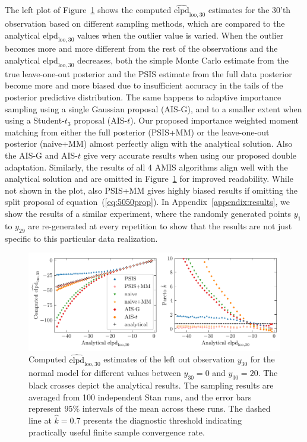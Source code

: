 \documentclass[12pt]{article}
\begin{document}
The left plot of Figure~\ref{fig:toynormal} shows the computed $\widehat{\text{elpd}}_{\text{loo},30}$ estimates
for the $30$'th observation based on different sampling methods, which are
compared to the analytical $\text{elpd}_{\text{loo},30}$ values when the outlier
value is varied.
When the outlier becomes more and more different from the rest of the observations and
the analytical $\text{elpd}_{\text{loo},30}$ decreases, both
the simple Monte Carlo estimate from the true leave-one-out
posterior and the PSIS estimate from the full data posterior
become more and more biased
due to insufficient accuracy in the tails of the posterior predictive distribution.
The same happens to adaptive importance sampling using a single Gaussian proposal (AIS-G),
and to a smaller extent when using a
Student-$t_3$ proposal (AIS-$t$).
Our proposed importance weighted moment matching from either the full posterior (PSIS+MM) or the leave-one-out posterior (naive+MM)
almost perfectly align with the analytical solution.
Also the AIS-G and AIS-$t$ give very accurate results when using our proposed
double adaptation. Similarly, the results of all 4 AMIS algorithms align well with the analytical solution and are omitted in Figure~\ref{fig:toynormal} for improved readability.
While not shown in the plot, also PSIS+MM gives highly biased results if omitting the split proposal
of equation~(\ref{eq:5050prop}).
%
%
%
%
In Appendix~\ref{appendix:results}, we show the results of a similar experiment, where
the randomly generated points $y_{1}$ to $y_{29}$ are re-generated at every repetition
to show that the results are not just specific to this particular data realization.



\begin{figure}[t]
\centering
\includegraphics[width=\textwidth]{figs/normaldata_mm_ais2_comb.pdf}
%
\caption{Computed $\widehat{\text{elpd}}_{\text{loo},30}$ estimates of the left out observation $y_{30}$ for the normal model
for different values between $y_{30} = 0$ and $y_{30} = 20$.
The black crosses depict the analytical results. The sampling results are averaged from 100 independent Stan runs, and the error bars represent $95 \%$
intervals of the mean across these runs. The dashed line
at $\hat{k} = 0.7$ presents the diagnostic threshold indicating practically useful finite sample convergence rate.} \label{fig:toynormal}
\end{figure}
\end{document}

